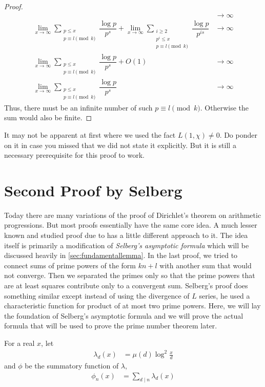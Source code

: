 \documentclass[elemannt.tex]{subfile}
\begin{document}
\begin{proof}
\begin{align*}
						& \to\infty\\
					\lim_{x\to\infty}\sum_{\substack{p\leq x\\p\equiv l\pmod{k}}}\dfrac{\log{p}}{p^{s}}+\lim_{x\to\infty}\sum_{\substack{i\geq 2\\p^{i}\leq x\\p\equiv l\pmod{k}}}\dfrac{\log{p}}{p^{is}}
						& \to\infty\\
					\lim_{x\to\infty}\sum_{\substack{p\leq x\\p\equiv l\pmod{k}}}\dfrac{\log{p}}{p^{s}}+O(1)
						& \to\infty\\
					\lim_{x\to\infty}\sum_{\substack{p\leq x\\p\equiv l\pmod{k}}}\dfrac{\log{p}}{p^{s}}
						& \to\infty
				\end{align*}
			Thus, there must be an infinite number of such $p\equiv l\pmod{k}$. Otherwise the sum would also be finite.
		\end{proof}

		\begin{note}
			It may not be apparent at first where we used the fact $L(1, \chi)\neq0$. Do ponder on it in case you missed that we did not state it explicitly. But it is still a necessary prerequisite for this proof to work.
		\end{note}
	\section{Second Proof by Selberg}
	Today there are many variations of the proof of Dirichlet's theorem on arithmetic progressions. But most proofs essentially have the same core idea. A much lesser known and studied proof due to \textcite{selberg_1949} has a little different approach to it. The idea itself is primarily a modification of \textit{Selberg's asymptotic formula} which will be discussed heavily in \autoref{sec:fundamentallemma}. In the last proof, we tried to connect sums of prime powers of the form $kn+l$ with another sum that would not converge. Then we separated the primes only so that the prime powers that are at least squares contribute only to a convergent sum. Selberg's proof does something similar except instead of using the divergence of $L$ series, he used a characteristic function for product of at most two prime powers. Here, we will lay the foundation of Selberg's asymptotic formula and we will prove the actual formula that will be used to prove the prime number theorem later.

	For a real $x$, let
		\begin{align*}
			\lambda_{d}(x)
				& = \mu(d)\log^{2}{\frac{x}{d}}
		\end{align*}
	and $\phi$ be the summatory function of $\lambda$,
		\begin{align*}
			\phi_{n}(x)
			& = \sum_{d\mid n}\lambda_{d}(x)
		\end{align*}
\end{document}
